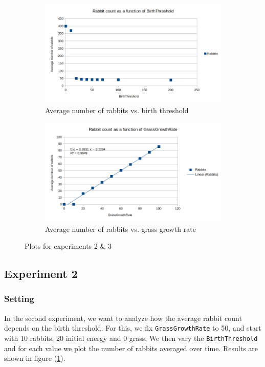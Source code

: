 \documentclass[11pt]{article}
\begin{document}
\begin{figure}[h!]
    \begin{subfigure}{.5\textwidth}
        \centering
        \includegraphics[width=.95\linewidth]{intro_rabbits/birththreshold.png}
        \caption{Average number of rabbits vs. birth threshold}
        \label{fig:birththreshold}
    \end{subfigure}
    \hfill
    \begin{subfigure}{.5\textwidth}
        \centering
        \includegraphics[width=.95\linewidth]{intro_rabbits/grassgrowthrate.png}
        \caption{Average number of rabbits vs. grass growth rate}
        \label{fig:grassgrowthrate}
    \end{subfigure}
    \caption{Plots for experiments 2 \& 3}
    \label{fig:my_label}
\end{figure}

\subsection{Experiment 2}
\subsubsection{Setting}
In the second experiment, we want to analyze how the average rabbit count depends on the birth threshold. For this, we fix \texttt{GrassGrowthRate} to 50, and start with 10 rabbits, 20 initial energy and 0 grass. We then vary the \texttt{BirthThreshold} and for each value we plot the number of rabbits averaged over time. Results are shown in figure (\ref{fig:birththreshold}).
\end{document}
